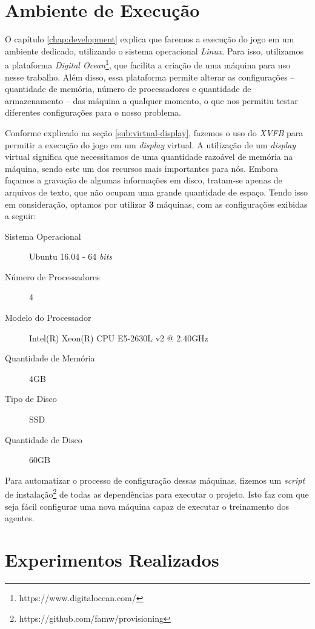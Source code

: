 

\section{\label{section:environment}Ambiente de Execução}
O capítulo \ref{chap:development} explica que faremos a execução do jogo em um
ambiente dedicado, utilizando o sistema operacional \textit{Linux}. Para isso,
utilizamos a plataforma \textit{Digital
Ocean}\footnote{https://www.digitalocean.com/}, que facilita a criação de uma
máquina para uso nesse trabalho. Além disso, essa plataforma permite alterar as
configurações -- quantidade de memória, número de processadores e quantidade de
armazenamento -- das máquina a qualquer momento, o que nos permitiu testar
diferentes configurações para o nosso problema.

Conforme explicado na seção \ref{sub:virtual-display}, fazemos o uso do
\textit{XVFB} para permitir a execução do jogo em um \textit{display} virtual. A
utilização de um \textit{display} virtual significa que necessitamos de uma
quantidade razoável de memória na máquina, sendo este um dos recursos mais
importantes para nós. Embora façamos a gravação de algumas informações em disco,
tratam-se apenas de arquivos de texto, que não ocupam uma grande quantidade de
espaço. Tendo isso em consideração, optamos por utilizar \textbf{3} máquinas,
com as configurações exibidas a seguir:

\begin{description}
    \item [Sistema Operacional] Ubuntu 16.04 - 64 \textit{bits}
    \item [Número de Processadores] 4
    \item [Modelo do Processador] Intel(R) Xeon(R) CPU E5-2630L v2 @ 2.40GHz
    \item [Quantidade de Memória] 4GB
    \item [Tipo de Disco] SSD
    \item [Quantidade de Disco] 60GB
\end{description}

Para automatizar o processo de configuração dessas máquinas, fizemos um
\textit{script} de instalação\footnote{https://github.com/famw/provisioning} de
todas as dependências para executar o projeto. Isto faz com que seja fácil
configurar uma nova máquina capaz de executar o treinamento dos agentes.


\section{\label{section:experiments}Experimentos Realizados}

